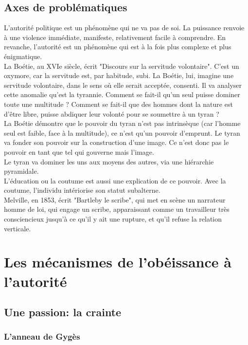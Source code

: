 \documentclass[10pt, a4paper, openany]{book}
\begin{document}
\section{Axes de problématiques}

L'autorité politique est un phénomène qui ne va pas de soi. La puissance renvoie à une violence immédiate, manifeste, relativement facile à comprendre. En revanche, l'autorité est un phénomène qui est à la fois plus complexe et plus énigmatique. \\
La Boétie, au XVIe siècle, écrit "Discours sur la servitude volontaire". C'est un oxymore, car la servitude est, par habitude, subi. La Boétie, lui, imagine une servitude volontaire, dans le sens où elle serait acceptée, consenti. Il va analyser cette anomalie qu'est la tyrannie. Comment se fait-il qu'un seul puisse dominer toute une multitude ? Comment se fait-il que des hommes dont la nature est d'être libre, puisse abdiquer leur volonté pour se soumettre à un tyran ? \\
La Boétie démontre que le pouvoir du tyran n'est pas intrinsèque (car l'homme seul est faible, face à la multitude), ce n'est qu'un pouvoir d'emprunt. Le tyran va fonder son pouvoir sur la construction d'une image. Ce n'est donc pas le pouvoir en tant que tel qui gouverne mais l'image. \\
Le tyran va dominer les uns aux moyens des autres, via une hiérarchie pyramidale. \\
L'éducation ou la coutume est aussi une explication de ce pouvoir. Avec la coutume, l'individu intériorise son statut subalterne. \\
Melville, en 1853, écrit "Bartleby le scribe", qui met en scène un narrateur homme de loi, qui engage un scribe, apparaissant comme un travailleur très consciencieux jusqu'à ce qu'il y ait une rupture, et qu'il refuse la relation verticale. 


\chapter{Les mécanismes de l'obéissance à l'autorité}

\section{Une passion: la crainte}

\subsection{L'anneau de Gygès}
\end{document}
